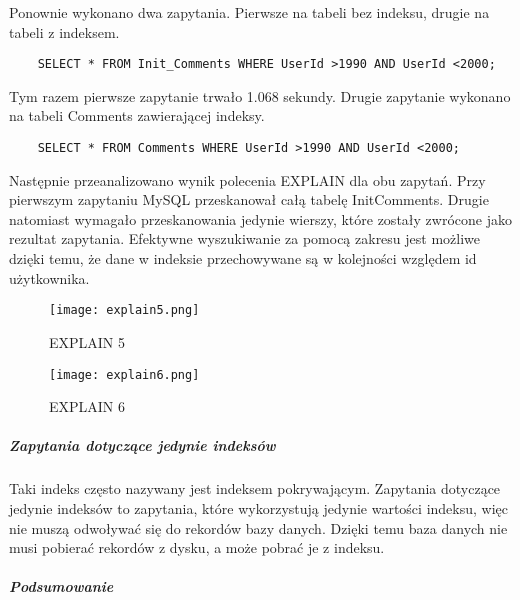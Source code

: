 Ponownie wykonano dwa zapytania. Pierwsze na tabeli bez indeksu, drugie na tabeli z indeksem.
\begin{verbatim}
    SELECT * FROM Init_Comments WHERE UserId >1990 AND UserId <2000;
\end{verbatim}

Tym razem pierwsze zapytanie trwało 1.068 sekundy. Drugie zapytanie wykonano na tabeli Comments zawierającej indeksy.
\begin{verbatim}
    SELECT * FROM Comments WHERE UserId >1990 AND UserId <2000;
\end{verbatim}
Następnie przeanalizowano wynik polecenia EXPLAIN dla obu zapytań. Przy pierwszym zapytaniu MySQL przeskanował całą tabelę Init\textunderscore Comments. Drugie natomiast wymagało przeskanowania jedynie wierszy, które zostały zwrócone jako rezultat zapytania.
Efektywne wyszukiwanie za pomocą zakresu jest możliwe dzięki temu, że dane w indeksie przechowywane są w kolejności względem id użytkownika.
\begin{figure}[h]
	\centering
    \texttt{[image: explain5.png]} 
    \caption{EXPLAIN 5}
\end{figure}

\begin{figure}[h]
	\centering
    \texttt{[image: explain6.png]} 
    \caption{EXPLAIN 6}
\end{figure}



\subparagraph{Zapytania dotyczące jedynie indeksów}\mbox{} \newline
Taki indeks często nazywany jest indeksem pokrywającym. Zapytania dotyczące jedynie indeksów to zapytania, które wykorzystują jedynie wartości indeksu, więc nie muszą odwoływać się do rekordów bazy danych. Dzięki temu baza danych nie musi pobierać rekordów z dysku, a może pobrać je z indeksu.


\subparagraph{Podsumowanie}\mbox{} \newline


